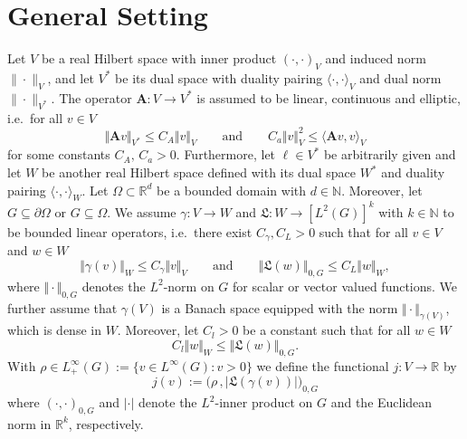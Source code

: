\documentclass[12pt,twoside,reqno]{amsart}
\theoremstyle{definition}
\numberwithin{equation}{section}
\renewcommand{\L}{\mathfrak{L}}
\newcommand{\A} {\bm{A}}
\newcommand{\lin} {\bm{\ell}}
\newcommand  {\R}  {\mathbb R}
\newcommand  {\N}  {\mathbb N}
\newcommand{\norm}[1]    {\Vert #1 \Vert}
\begin{document}
\section{General Setting}\label{sec: framework}
%
   Let $V$ be a real Hilbert space with inner product $(\cdot,\cdot)_V$ and induced norm $\| \cdot \|_V$, and let $V^*$ be its dual space with duality pairing $\langle \cdot,\cdot \rangle_V$ and dual norm $\|\cdot\|_{V^*}$. The operator $\A: V\to V^*$ is assumed to be linear, continuous and elliptic, i.e.~for all $v\in V$
    \begin{equation}\label{eq: Contiuity & Ellipticity of A}
        \Vert \A v \Vert_{V^*}\leq C_A\Vert v\Vert_V \qquad \text{and} \qquad  C_a \Vert v\Vert_V^2 \leq \langle \A v,v\rangle_V
    \end{equation}
    for some constants $C_A,\,C_a>0$. Furthermore, let $\lin\in V^*$ be arbitrarily given and let $W$ be another real Hilbert space defined with its dual space $W^*$ and duality pairing $\langle \cdot,\cdot \rangle_W$. Let $\Omega\subset\R^d$ be a bounded domain with {$d\in\N $}. Moreover, let $G\subseteq\partial\Omega$ or $G\subseteq\Omega$. We assume $\gamma:V\to W$ and $\mathfrak{L}:W\to [L^2(G)]^k$ with $k\in\N$ to be bounded linear operators, i.e.~there exist $ C_{\gamma},C_L>0$ such that for all $v \in V$ and $w \in W$
    \begin{equation}\label{eq: Continuity of gamma and L}
        \norm{\gamma(v)}_W\leq C_{\gamma}\norm{v}_V\qquad \text{and} \qquad \norm{\L(w)}_{0,G}\leq C_L\norm{w}_W,
    \end{equation}   
    where $\norm{\cdot}_{0,G}$ denotes the $L^2$-norm on $G$ for scalar or vector valued functions.
     We further assume that $\gamma(V)$ is a Banach space equipped with the norm $\norm{\cdot}_{\gamma(V)}$, which is dense in $W$. Moreover, let $C_l>0$ be a constant such that for all $w \in W$ 
    \begin{equation}\label{eq: Lowerbound for L}
        C_l\norm{w}_W\leq\norm{\L(w)}_{0,G}.
    \end{equation}
    With $\rho\in L^{\infty}_+(G):=\{v\in L^\infty(G):v>0\}$ we define the functional $j: V \to\R$ by
    \begin{equation*}%
        j(v) := \bigl(\rho\,,|\mathfrak{L}(\gamma(v))|\bigr)_{0,G}
    \end{equation*}     
    where $(\cdot,\cdot)_{0,G}$ and $|\cdot|$ denote the $L^2$-inner product on $G$ and the Euclidean norm in $\mathbb{R}^k$, respectively.
    
\end{document}
